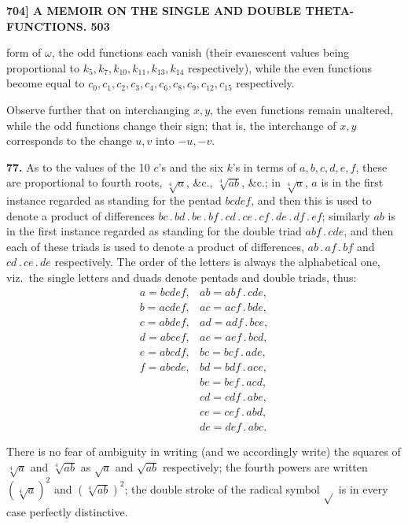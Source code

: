 \documentclass[11pt]{article}
\begin{document}
\bigskip
\noindent\textbf{704] \hfill A MEMOIR ON THE SINGLE AND DOUBLE THETA-FUNCTIONS. \hfill 503}

\medskip
form of $\omega$, the odd functions each vanish (their evanescent values being proportional to $k_5, k_7, k_{10}, k_{11}, k_{13}, k_{14}$ respectively), while the even functions become equal to $c_0, c_1, c_2, c_3, c_4, c_6, c_8, c_9, c_{12}, c_{15}$ respectively.

Observe further that on interchanging $x, y$, the even functions remain unaltered, while the odd functions change their sign; that is, the interchange of $x, y$ corresponds to the change $u, v$ into $-u, -v$.

\medskip
\textbf{77.} As to the values of the 10 $c$'s and the six $k$'s in terms of $a,b,c,d,e,f$, these are proportional to fourth roots, $\sqrt[4]{a}$, \&c., $\sqrt[4]{ab}$, \&c.; in $\sqrt[4]{a}$, $a$ is in the first instance regarded as standing for the pentad $bcdef$, and then this is used to denote a product of differences $bc\,.\,bd\,.\,be\,.\,bf\,.\,cd\,.\,ce\,.\,cf\,.\,de\,.\,df\,.\,ef$; similarly $ab$ is in the first instance regarded as standing for the double triad $abf\,.\,cde$, and then each of these triads is used to denote a product of differences, $ab\,.\,af\,.\,bf$ and $cd\,.\,ce\,.\,de$ respectively. The order of the letters is always the alphabetical one, viz.\ the single letters and duads denote pentads and double triads, thus:
\[
\begin{array}{ll}
a = bcdef, & ab = abf\,.\,cde,\\
b = acdef, & ac = acf\,.\,bde,\\
c = abdef, & ad = adf\,.\,bce,\\
d = abcef, & ae = aef\,.\,bcd,\\
e = abcdf, & bc = bcf\,.\,ade,\\
f = abcde, & bd = bdf\,.\,ace,\\
                & be = bef\,.\,acd,\\
                & cd = cdf\,.\,abe,\\
                & ce = cef\,.\,abd,\\
                & de = def\,.\,abc.
\end{array}
\]

There is no fear of ambiguity in writing (and we accordingly write) the squares of $\sqrt[4]{a}$ and $\sqrt[4]{ab}$ as $\sqrt{a}$ and $\sqrt{ab}$ respectively; the fourth powers are written $(\sqrt[4]{a})^2$ and $(\sqrt[4]{ab})^2$; the double stroke of the radical symbol $\sqrt{}$ is in every case perfectly distinctive.
\end{document}
